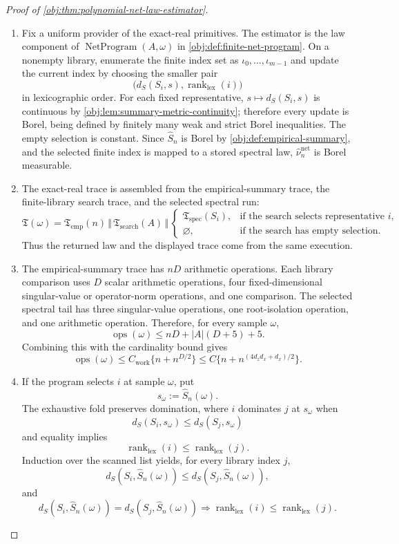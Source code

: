 \documentclass[11pt]{article}
\begin{document}
\begin{proof}[Proof of \cref{obj:thm:polynomial-net-law-estimator}]
\begin{enumerate}
\item Fix a uniform provider of the exact-real primitives.  The estimator is the
law component of \(\operatorname{NetProgram}(A,\omega)\) in
\cref{obj:def:finite-net-program}.  On a nonempty library, enumerate the finite
index set as \(\iota_0,\ldots,\iota_{m-1}\) and update the current index by
choosing the smaller pair
\[
\bigl(d_S(S_i,s),\operatorname{rank}_{\mathrm{lex}}(i)\bigr)
\]
in lexicographic order.  For each fixed representative,
\(s\mapsto d_S(S_i,s)\) is continuous by
\cref{obj:lem:summary-metric-continuity}; therefore every update is Borel,
being defined by finitely many weak and strict Borel inequalities.  The empty
selection is constant.  Since \(\widehat S_n\) is Borel by
\cref{obj:def:empirical-summary}, and the selected finite index is mapped to a
stored spectral law, \(\widehat\nu_n^{\mathrm{net}}\) is Borel measurable. %

\item The exact-real trace is assembled from the empirical-summary trace, the
finite-library search trace, and the selected spectral run:
\[
\mathfrak T(\omega)
=
\mathfrak T_{\mathrm{emp}}(n)
\,\Vert\,
\mathfrak T_{\mathrm{search}}(A)
\,\Vert\,
\begin{cases}
\mathfrak T_{\mathrm{spec}}(S_i),
&\text{if the search selects representative }i,\\
\varnothing,
&\text{if the search has empty selection.}
\end{cases}
\]
Thus the returned law and the displayed trace come from the same execution. %

\item The empirical-summary trace has \(nD\) arithmetic operations.  Each
library comparison uses \(D\) scalar arithmetic operations, four
fixed-dimensional singular-value or operator-norm operations, and one
comparison.  The selected spectral tail has three singular-value operations,
one root-isolation operation, and one arithmetic operation.  Therefore, for
every sample \(\omega\),
\[
\operatorname{ops}(\omega)
\le
nD+|A|(D+5)+5 .
\]
Combining this with the cardinality bound gives
\[
\operatorname{ops}(\omega)
\le
C_{\mathrm{work}}\{n+n^{D/2}\}
\le
C\{n+n^{(4d_zd_x+d_x)/2}\}.
\] %

\item If the program selects \(i\) at sample \(\omega\), put
\[
s_\omega:=\widehat S_n(\omega).
\]
The exhaustive fold preserves domination, where \(i\) dominates \(j\) at
\(s_\omega\) when
\[
d_S(S_i,s_\omega)\le d_S(S_j,s_\omega)
\]
and equality implies
\[
\operatorname{rank}_{\mathrm{lex}}(i)
\le
\operatorname{rank}_{\mathrm{lex}}(j).
\]
Induction over the scanned list yields, for every library index \(j\),
\[
d_S(S_i,\widehat S_n(\omega))
\le d_S(S_j,\widehat S_n(\omega)),
\]
and
\[
d_S(S_i,\widehat S_n(\omega))
=
d_S(S_j,\widehat S_n(\omega))
\Longrightarrow
\operatorname{rank}_{\mathrm{lex}}(i)
\le
\operatorname{rank}_{\mathrm{lex}}(j).
\] %


\end{enumerate}
\end{proof}
\end{document}
